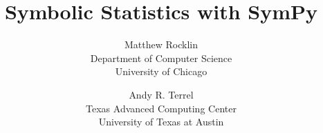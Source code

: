 

\title{Symbolic Statistics with SymPy}
\author{
Matthew Rocklin \\
Department of Computer Science\\
University of Chicago

\and

Andy R. Terrel \\
Texas Advanced Computing Center \\
University of Texas at Austin
}

\date{}
%

\maketitle



%








